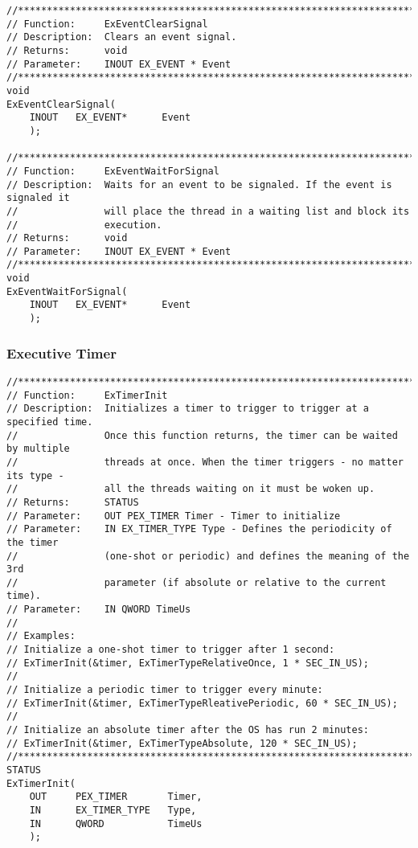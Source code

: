 \begin{appendices}
\begin{lstlisting}[caption={Executive Event Functions},label={lst:ExEventFunc}]
//******************************************************************************
// Function:     ExEventClearSignal
// Description:  Clears an event signal.
// Returns:      void
// Parameter:    INOUT EX_EVENT * Event
//******************************************************************************
void
ExEventClearSignal(
    INOUT   EX_EVENT*      Event
    );

//******************************************************************************
// Function:     ExEventWaitForSignal
// Description:  Waits for an event to be signaled. If the event is signaled it
//               will place the thread in a waiting list and block its
//               execution.
// Returns:      void
// Parameter:    INOUT EX_EVENT * Event
//******************************************************************************
void
ExEventWaitForSignal(
    INOUT   EX_EVENT*      Event
    );
\end{lstlisting}

\subsubsection{Executive Timer}
\label{sect:ExTimer}

\begin{lstlisting}[caption={Timer functions},label={lst:TimerFunc}]
//******************************************************************************
// Function:     ExTimerInit
// Description:  Initializes a timer to trigger to trigger at a specified time.
//               Once this function returns, the timer can be waited by multiple
//               threads at once. When the timer triggers - no matter its type -
//               all the threads waiting on it must be woken up.
// Returns:      STATUS
// Parameter:    OUT PEX_TIMER Timer - Timer to initialize
// Parameter:    IN EX_TIMER_TYPE Type - Defines the periodicity of the timer
//               (one-shot or periodic) and defines the meaning of the 3rd
//               parameter (if absolute or relative to the current time).
// Parameter:    IN QWORD TimeUs
//
// Examples:
// Initialize a one-shot timer to trigger after 1 second:
// ExTimerInit(&timer, ExTimerTypeRelativeOnce, 1 * SEC_IN_US);
//
// Initialize a periodic timer to trigger every minute:
// ExTimerInit(&timer, ExTimerTypeRleativePeriodic, 60 * SEC_IN_US);
//
// Initialize an absolute timer after the OS has run 2 minutes:
// ExTimerInit(&timer, ExTimerTypeAbsolute, 120 * SEC_IN_US);
//******************************************************************************
STATUS
ExTimerInit(
    OUT     PEX_TIMER       Timer,
    IN      EX_TIMER_TYPE   Type,
    IN      QWORD           TimeUs
    );


\end{lstlisting}
\end{appendices}

